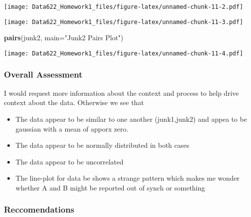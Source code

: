 \documentclass[]{article}
\newenvironment{Shaded}{\begin{snugshade}}{\end{snugshade}}
\newcommand{\KeywordTok}[1]{\textcolor[rgb]{0.13,0.29,0.53}{\textbf{#1}}}
\newcommand{\DataTypeTok}[1]{\textcolor[rgb]{0.13,0.29,0.53}{#1}}
\newcommand{\DecValTok}[1]{\textcolor[rgb]{0.00,0.00,0.81}{#1}}
\newcommand{\StringTok}[1]{\textcolor[rgb]{0.31,0.60,0.02}{#1}}
\newcommand{\OperatorTok}[1]{\textcolor[rgb]{0.81,0.36,0.00}{\textbf{#1}}}
\newcommand{\NormalTok}[1]{#1}
\providecommand{\tightlist}{%
  \setlength{\itemsep}{0pt}\setlength{\parskip}{0pt}}
\begin{document}
\texttt{[image: Data622\_Homework1\_files/figure-latex/unnamed-chunk-11-2.pdf]}

\begin{Shaded}
\end{Shaded}

\texttt{[image: Data622\_Homework1\_files/figure-latex/unnamed-chunk-11-3.pdf]}

\begin{Shaded}
\begin{Highlighting}[]
\KeywordTok{pairs}\NormalTok{(junk2, }\DataTypeTok{main=}\StringTok{"Junk2 Pairs Plot"}\NormalTok{)}
\end{Highlighting}
\end{Shaded}

\texttt{[image: Data622\_Homework1\_files/figure-latex/unnamed-chunk-11-4.pdf]}

\subsubsection{Overall Assessment}\label{overall-assessment}

I would request more information about the context and process to help
drive context about the data. Otherwise we see that

\begin{itemize}
\tightlist
\item
  The data appear to be similar to one another (junk1,junk2) and appea
  to be gaussian with a mean of apporx zero.
\item
  The data appear to be normally distributed in both cases
\item
  The data appear to be uncorrelated
\item
  The line-plot for data be shows a strange pattern which makes me
  wonder whether A and B might be reported out of synch or something
\end{itemize}

\subsubsection{Reccomendations}\label{reccomendations}
\end{document}
